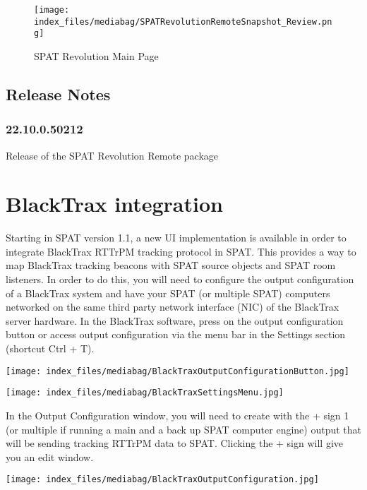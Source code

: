 \documentclass[
  letterpaper,
  DIV=11,
  numbers=noendperiod]{scrreport}
\begin{document}
\begin{figure}

{\centering \texttt{[image: index\_files/mediabag/SPATRevolutionRemoteSnapshot\_Review.png]}

}

\caption{SPAT Revolution Main Page}

\end{figure}

\hypertarget{release-notes}{%
\section{Release Notes}\label{release-notes}}

\hypertarget{section}{%
\subsection{22.10.0.50212}\label{section}}

Release of the SPAT Revolution Remote package

\hypertarget{blacktrax-integration}{%
\chapter{BlackTrax integration}\label{blacktrax-integration}}

Starting in SPAT version 1.1, a new UI implementation is available in
order to integrate BlackTrax RTTrPM tracking protocol in SPAT. This
provides a way to map BlackTrax tracking beacons with SPAT source
objects and SPAT room listeners. In order to do this, you will need to
configure the output configuration of a BlackTrax system and have your
SPAT (or multiple SPAT) computers networked on the same third party
network interface (NIC) of the BlackTrax server hardware. In the
BlackTrax software, press on the output configuration button or access
output configuration via the menu bar in the Settings section (shortcut
Ctrl + T).

\texttt{[image: index\_files/mediabag/BlackTraxOutputConfigurationButton.jpg]}

\texttt{[image: index\_files/mediabag/BlackTraxSettingsMenu.jpg]}

In the Output Configuration window, you will need to create with the +
sign 1 (or multiple if running a main and a back up SPAT computer
engine) output that will be sending tracking RTTrPM data to SPAT.
Clicking the + sign will give you an edit window.

\texttt{[image: index\_files/mediabag/BlackTraxOutputConfiguration.jpg]}
\end{document}
